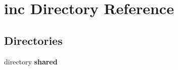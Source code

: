 \section{inc Directory Reference}
\label{dir_bfccd401955b95cf8c75461437045ac0}
\subsection*{Directories}
\begin{DoxyCompactItemize}
\item 
directory {\bf shared}
\end{DoxyCompactItemize}
